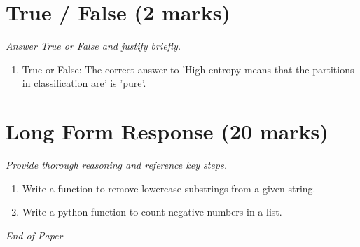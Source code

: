 \documentclass[12pt]{article}
\begin{document}
\section*{True / False (2 marks)}
\textit{Answer True or False and justify briefly.}
\begin{enumerate}[label=\arabic*.]
\item True or False: The correct answer to 'High entropy means that the partitions in classification are' is 'pure'.
\end{enumerate}

\section*{Long Form Response (20 marks)}
\textit{Provide thorough reasoning and reference key steps.}
\begin{enumerate}[label=\arabic*.]
\item Write a function to remove lowercase substrings from a given string.
\item Write a python function to count negative numbers in a list.
\end{enumerate}

\vfill
\noindent\textit{End of Paper}
\end{document}
